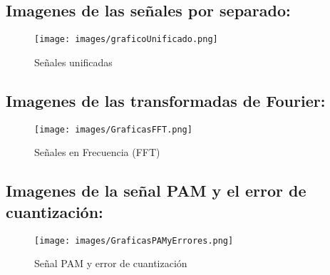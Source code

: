 \documentclass[12pt]{article}
\begin{document}
\newpage

\subsection*{Imagenes de las señales por separado:}
\begin{figure}[!h]
    \centering
    \texttt{[image: images/graficoUnificado.png]}
    \caption{Señales unificadas}
    \label{fig:signals_unificate}
\end{figure}
\newpage

\subsection*{Imagenes de las transformadas de Fourier:}

\begin{figure}[!h]
    \centering
    \texttt{[image: images/GraficasFFT.png]}
    \caption{Señales en Frecuencia (FFT)}
    \label{fig:signals_frequency}
\end{figure}

\newpage
\subsection*{Imagenes de la señal PAM y el error de cuantización:}
\begin{figure}[!h]
    \centering
    \texttt{[image: images/GraficasPAMyErrores.png]}
    \caption{Señal PAM y error de cuantización}
    \label{fig:pam_quantization_error}
\end{figure}
\end{document}
